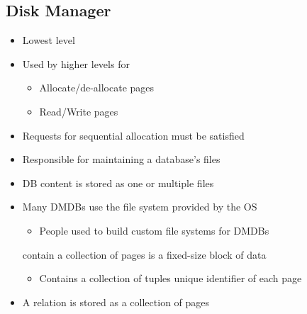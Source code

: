 \subsection{Disk Manager}
\begin{itemize}
    \item Lowest level
    \item Used by higher levels for
        \begin{itemize}
            \item Allocate/de-allocate pages
            \item Read/Write pages
        \end{itemize}
    \item Requests for sequential allocation must be satisfied
    \item Responsible for maintaining a database's files
    \item DB content is stored as one or multiple files
    \item Many DMDBs use the file system provided by the OS
        \begin{itemize}
            \item People used to build custom file systems for DMDBs
        \end{itemize}
     contain a collection of pages
     is a fixed-size block of data
        \begin{itemize}
            \item Contains a collection of tuples
             unique identifier of each page
        \end{itemize}
    \item A relation is stored as a collection of pages
\end{itemize}

